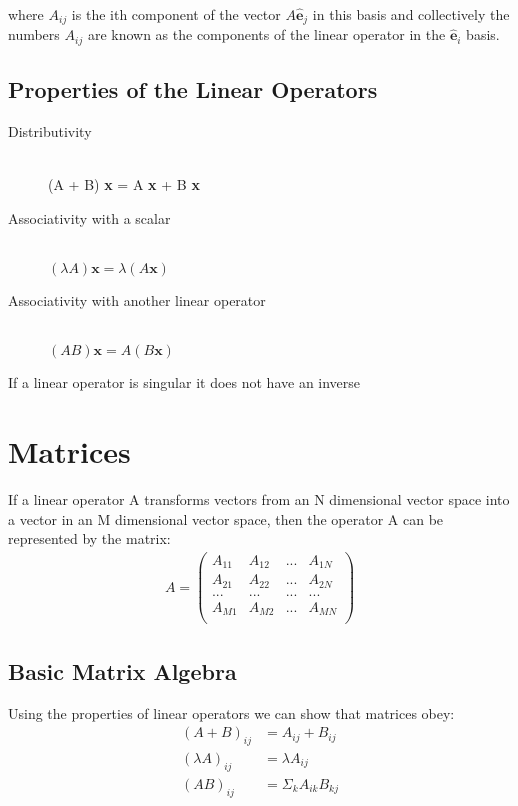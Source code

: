 \documentclass{article}
\begin{document}
where $ A_{ij} $ is the ith component of the vector $ A \hat{\textbf{e}}_j $ in this basis and collectively the numbers $ A_{ij} $ are known as the components of the linear operator in the $ \hat{\textbf{e}}_i $ basis.

\subsection{Properties of the Linear Operators}

\begin{description}
  \item[Distributivity] \hfill \\ (A + B) \textbf{x} = A \textbf{x} + B \textbf{x}
  \item[Associativity with a scalar] \hfill \\ $ (\lambda A) \textbf{x} = \lambda (A \textbf{x}) $
  \item[Associativity with another linear operator] \hfill \\ $ (AB) \textbf{x} = A (B \textbf{x}) $
\end{description}

If a linear operator is singular it does not have an inverse

\section{Matrices}

If a linear operator A transforms vectors from an N dimensional vector space into a vector in an M dimensional vector space, then the operator A can be represented by the matrix:
\begin{align}
	A = \begin{pmatrix}
		A_{11} & A_{12} & ... & A_{1N} \\
		A_{21} & A_{22} & ... & A_{2N} \\
		... & ... & ... & ... \\
		 A_{M1} & A_{M2} & ... & A_{MN} \\
	\end{pmatrix}
\end{align}

\subsection{Basic Matrix Algebra}

Using the properties of linear operators we can show that matrices obey:
\begin{align}
	(A + B)_{ij} & = A_{ij} + B_{ij} \\
	(\lambda A)_{ij} & = \lambda A_{ij} \\
	(AB)_{ij} & = \Sigma_k A_{ik} B_{kj}
\end{align}
\end{document}

